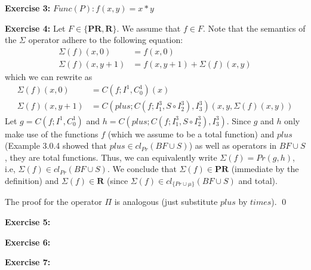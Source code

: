 \documentclass [11pt]{article}
\newcommand{\PR}{\textbf{PR}}
\newcommand{\R}{\textbf{R}}
\begin{document}
\bigskip
\noindent
\textbf{Exercise 3:}
$Func(P): f(x,y) = x*y$

\bigskip
\noindent
\textbf{Exercise 4:}
Let $F \in \{\PR, \R\}$. 
We assume that $f \in F$.
Note that the semantics of the $\Sigma$ operator adhere to the following equation:
\begin{align*}
\Sigma(f)(x,0) &= f(x,0) \\
\Sigma(f)(x, y+1) &= f(x,y+1) + \Sigma(f)(x,y)
\end{align*}
which we can rewrite as
\begin{align*}
\Sigma(f)(x,0) &= C(f; I^1, C^1_0)(x) \\
\Sigma(f)(x, y+1) &= C(plus; C(f; I^3_1, S \circ I^3_2), I^3_3) (x,y, \Sigma(f)(x,y))
\end{align*}
Let $g = C(f; I^1, C^1_0)$ and $h = C(plus; C(f; I^3_1, S \circ I^3_2), I^3_3)$. 
Since $g$ and $h$ only make use of the functions $f$ (which we assume to be a total function) and $plus$ (Example 3.0.4 showed that $plus \in cl_{Pr}(BF\cup S)$) as well as operators in $BF \cup S$, they are total functions.
Thus, we can equivalently write $\Sigma(f) = Pr(g, h)$, i.e, $\Sigma(f) \in cl_{Pr}(BF \cup S)$. 
We conclude that $\Sigma(f) \in \PR$ (immediate by the definition) and $\Sigma(f) \in \R$ (since $\Sigma(f) \in cl_{\{Pr \cup \mu \}}(BF \cup S)$ and total). 

\medskip
\noindent
The proof for the operator $\Pi$ is analogous (just substitute $plus$ by $times$).
\qed


\bigskip
\noindent
\textbf{Exercise 5:}

\bigskip
\noindent
\textbf{Exercise 6:}

\bigskip
\noindent
\textbf{Exercise 7:}

 
\end{document}
